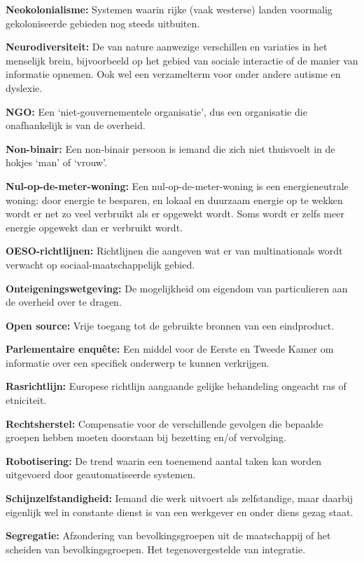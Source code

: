 \textbf{Neokolonialisme:} Systemen waarin rijke (vaak westerse) landen
voormalig gekoloniseerde gebieden nog steeds uitbuiten.

\textbf{Neurodiversiteit:} De van nature aanwezige verschillen en
variaties in het menselijk brein, bijvoorbeeld op het gebied van sociale
interactie of de manier van informatie opnemen. Ook wel een verzamelterm
voor onder andere autisme en dyslexie.

\textbf{NGO:} Een `niet-gouvernementele organisatie', dus een
organisatie die onafhankelijk is van de overheid.

\textbf{Non-binair:} Een non-binair persoon is iemand die zich niet
thuisvoelt in de hokjes `man' of `vrouw'.

\textbf{Nul-op-de-meter-woning:} Een nul-op-de-meter-woning is een
energieneutrale woning: door energie te besparen, en lokaal en duurzaam
energie op te wekken wordt er net zo veel verbruikt als er opgewekt
wordt. Soms wordt er zelfs meer energie opgewekt dan er verbruikt wordt.

\textbf{OESO-richtlijnen:} Richtlijnen die aangeven wat er van
multinationals wordt verwacht op sociaal-maatschappelijk gebied.

\textbf{Onteigeningswetgeving:} De mogelijkheid om eigendom van
particulieren aan de overheid over te dragen.

\textbf{Open source:} Vrije toegang tot de gebruikte bronnen van een
eindproduct.

\textbf{Parlementaire enquête:} Een middel voor de Eerste en Tweede
Kamer om informatie over een specifiek onderwerp te kunnen verkrijgen.

\textbf{Rasrichtlijn:} Europese richtlijn aangaande gelijke behandeling
ongeacht ras of etniciteit.

\textbf{Rechtsherstel:} Compensatie voor de verschillende gevolgen die
bepaalde groepen hebben moeten doorstaan bij bezetting en/of vervolging.

\textbf{Robotisering:} De trend waarin een toenemend aantal taken kan
worden uitgevoerd door geautomatiseerde systemen.

\textbf{Schijnzelfstandigheid:} Iemand die werk uitvoert als
zelfstandige, maar daarbij eigenlijk wel in constante dienst is van een
werkgever en onder diens gezag staat.

\textbf{Segregatie:} Afzondering van bevolkingsgroepen uit de
maatschappij of het scheiden van bevolkingsgroepen. Het
tegenovergestelde van integratie.

